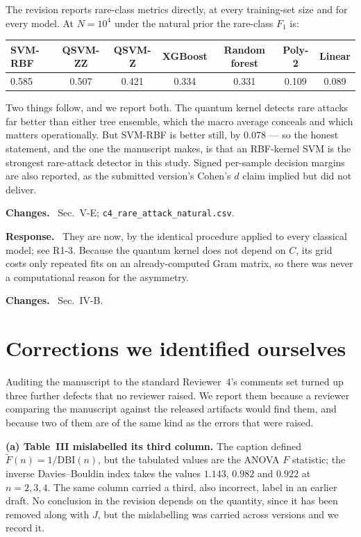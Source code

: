 \documentclass[11pt,a4paper]{article}
\newcommand{\itemhead}[2]{%
  \par\addvspace{15pt}%
  \noindent{\bfseries\color{tagink}#1}\hspace{0.7em}{\bfseries #2}%
  \par\addvspace{3.5pt}%
  \noindent{\color{rulegray}\rule{\linewidth}{0.5pt}}%
  \par\addvspace{5pt}%
  \nobreak}
\newcommand{\resp}{\par\addvspace{2pt}\noindent\textbf{Response.}\ }
\newcommand{\changed}{\par\addvspace{5pt}\noindent
  {\bfseries\color{tagink}Changes.}\ }
\begin{document}
The revision reports rare-class metrics directly, at every training-set size and
for every model. At $N=10^{4}$ under the natural prior the rare-class $F_1$ is:

\begin{center}
\small
\begin{tabular}{@{}lcccccc@{}}
\toprule
SVM-RBF & QSVM-ZZ & QSVM-Z & XGBoost & Random forest & Poly-2 & Linear \\
\midrule
0.585 & 0.507 & 0.421 & 0.334 & 0.331 & 0.109 & 0.089 \\
\bottomrule
\end{tabular}
\end{center}

Two things follow, and we report both. The quantum kernel detects rare attacks
far better than either tree ensemble, which the macro average conceals and which
matters operationally. But SVM-RBF is better still, by $0.078$ --- so the honest
statement, and the one the manuscript makes, is that an RBF-kernel SVM is the
strongest rare-attack detector in this study. Signed per-sample decision margins
are also reported, as the submitted version's Cohen's $d$ claim implied but did
not deliver.
\changed
Sec.~V-E; \texttt{c4\_rare\_attack\_natural.csv}.

\itemhead{R4-6}{The quantum kernel's hyper-parameters were not tuned}
\resp
They are now, by the identical procedure applied to every classical model; see
R1-3. Because the quantum kernel does not depend on $C$, its grid costs only
repeated fits on an already-computed Gram matrix, so there was never a
computational reason for the asymmetry.
\changed
Sec.~IV-B.

\section{Corrections we identified ourselves}
\label{sec:selfreported}

Auditing the manuscript to the standard Reviewer~4's comments set turned up
three further defects that no reviewer raised. We report them because a reviewer
comparing the manuscript against the released artifacts would find them, and
because two of them are of the same kind as the errors that were raised.

\textbf{(a) Table~III mislabelled its third column.} The caption defined
$\tilde F(n)=1/\mathrm{DBI}(n)$, but the tabulated values are the ANOVA $F$
statistic; the inverse Davies--Bouldin index takes the values $1.143$, $0.982$
and $0.922$ at $n=2,3,4$. The same column carried a third, also incorrect,
label in an earlier draft. No conclusion in the revision depends on the
quantity, since it has been removed along with $J$, but the mislabelling was
carried across versions and we record it.
\end{document}
